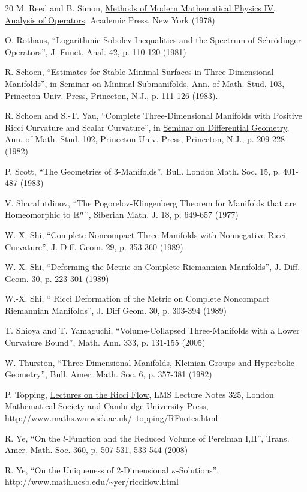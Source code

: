 \begin{thebibliography}{20}
 M. Reed and B. Simon,
\underline{Methods of Modern Mathematical Physics IV, Analysis of
Operators}, Academic Press, New York (1978)

 O. Rothaus,
``Logarithmic Sobolev Inequalities and the Spectrum of Schr\"odinger
Operators'', J. Funct. Anal. 42, p. 110-120 (1981)

 R. Schoen,
``Estimates for Stable Minimal Surfaces in Three-Dimensional Manifolds'',
in \underline{Seminar on Minimal Submanifolds},
Ann. of Math. Stud. 103, Princeton Univ. Press, Princeton, N.J., p. 111-126 (1983).

R. Schoen and S.-T. Yau,
``Complete Three-Dimensional Manifolds with Positive Ricci Curvature
  and Scalar Curvature'', in
\underline{Seminar on Differential Geometry}, Ann. of
  Math. Stud. 102,  Princeton Univ. Press, Princeton, N.J., p.  209-228 (1982)

 P. Scott,
``The Geometries of $3$-Manifolds'',
Bull. London Math. Soc. 15, p. 401-487 (1983)

 V. Sharafutdinov,
``The Pogorelov-Klingenberg Theorem for Manifolds that are Homeomorphic to
${\mathbb R}^n$'',
Siberian Math. J. 18, p. 649-657 (1977)

 W.-X. Shi, ``Complete Noncompact Three-Manifolds
with Nonnegative Ricci Curvature'',
J. Diff. Geom. 29, p. 353-360 (1989)

 W.-X. Shi, ``Deforming the Metric on Complete
Riemannian Manifolds'',
J. Diff. Geom. 30, p. 223-301 (1989)

 W.-X. Shi, `` Ricci Deformation of the Metric on
Complete Noncompact Riemannian Manifolds'',
J. Diff Geom. 30, p. 303-394 (1989)

 T. Shioya and T. Yamaguchi,
``Volume-Collapsed Three-Manifolds with a Lower Curvature Bound'',
Math. Ann. 333, p. 131-155 (2005)

 W. Thurston,
``Three-Dimensional Manifolds, Kleinian Groups and Hyperbolic Geometry'',
Bull. Amer. Math. Soc. 6, p. 357-381 (1982)

 P. Topping, \underline{Lectures on the Ricci Flow},
LMS Lecture Notes 325, London Mathematical Society and Cambridge University
Press,
http://www.maths.warwick.ac.uk/~topping/RFnotes.html

 R. Ye, ``On the $l$-Function and the Reduced Volume of
Perelman I,II'', Trans. Amer. Math. Soc. 360, p. 507-531, 533-544 (2008)

 R. Ye, ``On the Uniqueness of 2-Dimensional
$\kappa$-Solutions'',
http://www.math.ucsb.edu/\~{}yer/ricciflow.html
\end{thebibliography}
